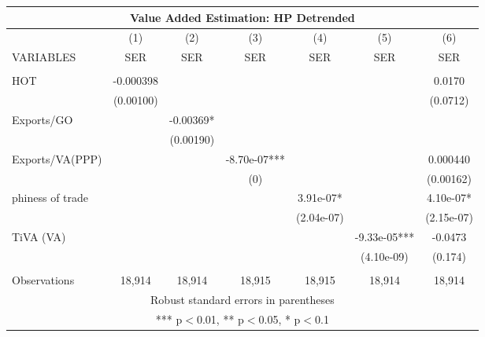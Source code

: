 \documentclass[]{article}
\begin{document}
\begin{tabular}{lcccccc}
\multicolumn{7}{c}{Value Added Estimation: HP Detrended} \\ \hline
 & (1) & (2) & (3) & (4) & (5) & (6) \\
VARIABLES & SER & SER & SER & SER & SER & SER \\ \hline
 &  &  &  &  &  &  \\
HOT & -0.000398 &  &  &  &  & 0.0170 \\
 & (0.00100) &  &  &  &  & (0.0712) \\
Exports/GO &  & -0.00369* &  &  &  &  \\
 &  & (0.00190) &  &  &  &  \\
Exports/VA(PPP) &  &  & -8.70e-07*** &  &  & 0.000440 \\
 &  &  & (0) &  &  & (0.00162) \\
phiness of trade &  &  &  & 3.91e-07* &  & 4.10e-07* \\
 &  &  &  & (2.04e-07) &  & (2.15e-07) \\
TiVA (VA) &  &  &  &  & -9.33e-05*** & -0.0473 \\
 &  &  &  &  & (4.10e-09) & (0.174) \\
 &  &  &  &  &  &  \\
 Observations & 18,914 & 18,914 & 18,915 & 18,915 & 18,914 & 18,914 \\ \hline
\multicolumn{7}{c}{ Robust standard errors in parentheses} \\
\multicolumn{7}{c}{ *** p$<$0.01, ** p$<$0.05, * p$<$0.1} \\
\end{tabular}
\end{document}
